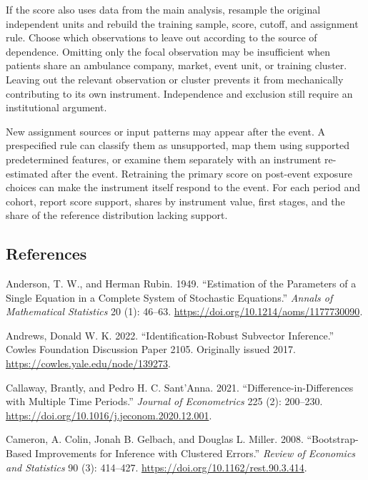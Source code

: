 \documentclass[
  11pt,
]{article}
\begin{document}
If the score also uses data from the main analysis, resample the
original independent units and rebuild the training sample, score,
cutoff, and assignment rule. Choose which observations to leave out
according to the source of dependence. Omitting only the focal
observation may be insufficient when patients share an ambulance
company, market, event unit, or training cluster. Leaving out the
relevant observation or cluster prevents it from mechanically
contributing to its own instrument. Independence and exclusion still
require an institutional argument.

\Needspace{0.16\textheight}

New assignment sources or input patterns may appear after the event. A
prespecified rule can classify them as unsupported, map them using
supported predetermined features, or examine them separately with an
instrument re-estimated after the event. Retraining the primary score on
post-event exposure choices can make the instrument itself respond to
the event. For each period and cohort, report score support, shares by
instrument value, first stages, and the share of the reference
distribution lacking support.

\begingroup
\small
\setlength{\parskip}{0.28em}

\hypertarget{references}{%
\subsection{References}\label{references}}

Anderson, T. W., and Herman Rubin. 1949. ``Estimation of the Parameters
of a Single Equation in a Complete System of Stochastic Equations.''
\emph{Annals of Mathematical Statistics} 20 (1): 46--63.
\url{https://doi.org/10.1214/aoms/1177730090}.

Andrews, Donald W. K. 2022. ``Identification-Robust Subvector
Inference.'' Cowles Foundation Discussion Paper 2105. Originally issued
2017. \url{https://cowles.yale.edu/node/139273}.

Callaway, Brantly, and Pedro H. C. Sant'Anna. 2021.
``Difference-in-Differences with Multiple Time Periods.'' \emph{Journal
of Econometrics} 225 (2): 200--230.
\url{https://doi.org/10.1016/j.jeconom.2020.12.001}.

Cameron, A. Colin, Jonah B. Gelbach, and Douglas L. Miller. 2008.
``Bootstrap-Based Improvements for Inference with Clustered Errors.''
\emph{Review of Economics and Statistics} 90 (3): 414--427.
\url{https://doi.org/10.1162/rest.90.3.414}.
\end{document}
